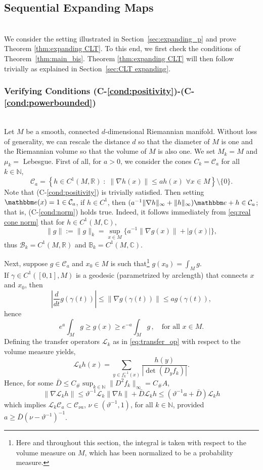 \documentclass{amsart}
\numberwithin{equation}{section}
\newcommand\cB{{\mathcal B}}
\newcommand\cC{{\mathcal C}}
\newcommand\cL{{\mathcal L}}
\newcommand\bB{{\mathbb B}}
\newcommand\bC{{\mathbb C}}
\newcommand\bN{{\mathbb N}}
\newcommand\bR{{\mathbb R}}
\newcommand{\bbe}{\mathbbm e}
\newcommand{\Const}{C_{\#}}
\begin{document}
\subsection{Sequential Expanding Maps}\ \\
\label{sec:expanding intro}
We consider the setting illustrated in Section~\ref{sec:expanding_p} and prove Theorem \ref{thm:expanding CLT}. To this end, we first check the conditions of Theorem~\ref{thm:main_bis}.
Theorem \ref{thm:expanding CLT} will then follow trivially as explained in Section~\ref{sec:CLT expanding}.

\subsubsection{ Verifying Conditions (C-\ref{cond:positivity})-(C-\ref{cond:powerbounded})} \ \\
Let $M$ be a smooth, connected $d$-dimensional  Riemannian manifold.  Without loss of generality, we can rescale the distance $d$ so that the diameter of $M$ is one and the Riemannian volume so that the volume of $M$ is also one.  We set $M_k=M$ and $\mu_k=$ Lebesgue. First of all, for $a> 0$, we consider the cones  $C_k = \cC_a$ for all $k \in \bN$,
\[
\cC_a =\left\{h\in C^1(M,\bR)\;:\; \|\nabla h(x)\| \leq a h(x) \,\, \forall x \in M \right\} \setminus \{ 0 \}.
\]
Note that (C-\ref{cond:positivity}) is trivially satisfied. Then setting $\bbe(x)=1\in \cC_a$, 
if $h\in C^1$, then $(a^{-1} \|\nabla h\|_\infty+\|h\|_\infty)\bbe+h\in \cC_a$;
that is, (C-\ref{cond:norm}) holds true.  
Indeed, it follows immediately from \eqref{eq:real cone norm} that
for $h \in C^1(M, \bC)$,
\[
\|g\|:=\|g\|_k= \sup_{x \in M} \{ a^{-1}\|\nabla g(x)\| + |g(x)| \}, 
\]
thus $\cB_k = C^1(M, \bR)$ and 
$\bB_k= C^1(M, \bC)$. 

Next, suppose 
$g\in \cC_a$ and $x_0\in M$ is such that\footnote{ Here and throughout this section, the integral
is taken with respect to the volume measure on $M$, which has been normalized to be a probability measure.} $g(x_0)=\int _M g$.\\
If $\gamma\in C^1([0,1],M)$ is a geodesic (parametrized by arclength) that connects $x$ and $x_0$, then
\[
\left| \frac{d}{dt}g(\gamma(t)) \right| \leq \|\nabla g(\gamma(t))\|\leq a g(\gamma(t)),
\]
hence 
\begin{equation}\label{eq:average bound}
e^a\int_M g\geq g(x)\geq e^{-a}\int_Mg \, , \quad \mbox{for all $x \in M$}.
\end{equation}
Defining the transfer operators $\cL_k$ as in \eqref{eq:transfer_op} with respect to the 
volume measure yields,
 \[
 \cL_k h(x)=\sum_{y\in f_k^{-1}(x)}\frac{h(y)}{\left|\det(D_yf_k)\right|} .
 \]
Hence, for some $\bar D\leq \Const \sup_{k \in \bN} \|D^2f_{k} \|_\infty = \Const A$,
\begin{equation}\label{eq:LY_exp}
\|\nabla \cL_k h\|\leq   \vartheta^{-1}\cL_k\|\nabla h\|+ \bar D \cL_k h\leq (\vartheta^{-1}a+ \bar D) \cL_k h
\end{equation}
which implies $\cL_k\cC_a\subset \cC_{\nu a}$, $\nu\in(\vartheta^{-1},1)$, for all $k \in \bN$, provided $a\geq \bar D(\nu-\vartheta^{-1})^{-1}$.
\end{document}
